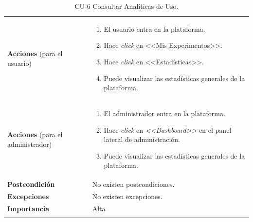 \begin{longtable}[H]{@{}ll@{}}
\begin{minipage}[t]{0.23\columnwidth}
\textbf{Acciones} (para el usuario)\strut
\end{minipage} & \begin{minipage}[t]{0.71\columnwidth}\raggedright\strut
\begin{enumerate}
\def\labelenumi{\arabic{enumi}.}
\tightlist
\item El usuario entra en la plataforma.
\item Hace \textit{click} en <<Mis Experimentos>>.
\item Hace \textit{click} en <<Estadísticas>>.
\item Puede visualizar las estadísticas generales de la plataforma.
\end{enumerate}\strut
\end{minipage}\tabularnewline
\begin{minipage}[t]{0.23\columnwidth}\raggedright\strut
\textbf{Acciones} (para el administrador)\strut
\end{minipage} & \begin{minipage}[t]{0.71\columnwidth}\raggedright\strut
\begin{enumerate}
\def\labelenumi{\arabic{enumi}.}
\tightlist
\item El administrador entra en la plataforma.
\item Hace \textit{click} en \textit{<<Dashboard>>} en el panel lateral de administración.
\item Puede visualizar las estadísticas generales de la plataforma.
\end{enumerate}\strut
\end{minipage}\tabularnewline
\begin{minipage}[t]{0.23\columnwidth}\raggedright\strut
\textbf{Postcondición}\strut
\end{minipage} & \begin{minipage}[t]{0.71\columnwidth}\raggedright\strut
No existen postcondiciones.\strut
\end{minipage}\tabularnewline
\begin{minipage}[t]{0.23\columnwidth}\raggedright\strut
\textbf{Excepciones}\strut
\end{minipage} & \begin{minipage}[t]{0.71\columnwidth}\raggedright\strut
No existen excepciones.\strut
\end{minipage}\tabularnewline
\begin{minipage}[t]{0.23\columnwidth}\raggedright\strut
\textbf{Importancia}\strut
\end{minipage} & \begin{minipage}[t]{0.71\columnwidth}\raggedright\strut
Alta\strut
\end{minipage}\tabularnewline
\bottomrule
\caption{CU-6 Consultar Analíticas de Uso.}
\end{longtable}

